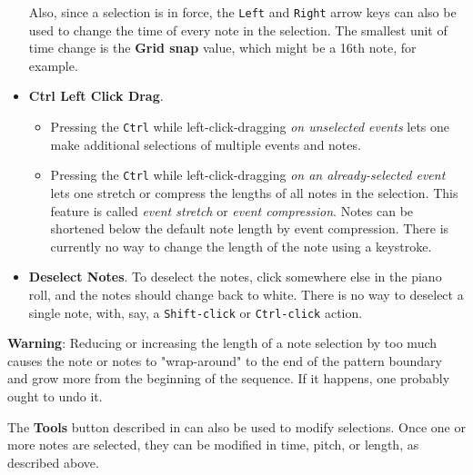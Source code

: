 \begin{itemize}
         Also, since a selection is in force, the
         \texttt{Left} and \texttt{Right} arrow keys can also
         be used to change the time of every note in the selection.
         The smallest unit of time change is the \textbf{Grid snap} value,
         which might be a 16th note, for example.
      \item
         \textbf{Ctrl Left Click Drag}.
         \begin{itemize}
            \item Pressing the \texttt{Ctrl} while left-click-dragging
               \textsl{on unselected events} lets one make additional
               selections of multiple events and notes.
            \item Pressing the \texttt{Ctrl} while left-click-dragging
               \textsl{on an already-selected event} lets one stretch or
               compress the lengths of all notes in the selection.
               This feature is called \textsl{event stretch}
               or \textsl{event compression}.
               Notes can be shortened below the default note length by event
               compression.  There is currently no way to change the length of
               the note using a keystroke.
         \end{itemize}
      \item {} 
         \textbf{Deselect Notes}.
         To deselect the notes, click somewhere else in the piano roll, and the
         notes should change back to white.  There is no way to deselect a
         single note, with, say, a \texttt{Shift-click} or
         \texttt{Ctrl-click} action.
   \end{itemize}

   \textbf{Warning}:  Reducing or increasing the length of a note selection
   by too much causes the note or notes to "wrap-around" to the end
   of the pattern boundary and grow more from the beginning of the sequence. 
   If it happens, one probably ought to undo it.

   The \textbf{Tools} button described in
    can also be used to
   modify selections.
   Once one or more notes are selected, they can be modified in time,
   pitch, or length, as described above.

